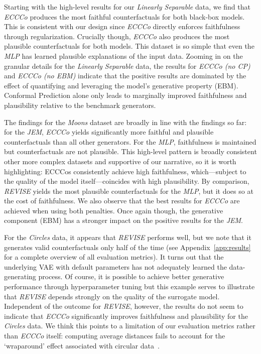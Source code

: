 \documentclass{article}
\begin{document}
Starting with the high-level results for our \textit{Linearly Separable} data, we find that \textit{ECCCo} produces the most faithful counterfactuals for both black-box models. This is consistent with our design since \textit{ECCCo} directly enforces faithfulness through regularization. Crucially though, \textit{ECCCo} also produces the most plausible counterfactuals for both models. This dataset is so simple that even the \textit{MLP} has learned plausible explanations of the input data. Zooming in on the granular details for the \textit{Linearly Separable} data, the results for \textit{ECCCo (no CP)} and \textit{ECCCo (no EBM)} indicate that the positive results are dominated by the effect of quantifying and leveraging the model's generative property (EBM). Conformal Prediction alone only leads to marginally improved faithfulness and plausibility relative to the benchmark generators. 

The findings for the \textit{Moons} dataset are broadly in line with the findings so far: for the \textit{JEM}, \textit{ECCCo} yields significantly more faithful and plausible counterfactuals than all other generators. For the \textit{MLP}, faithfulness is maintained but counterfactuals are not plausible. This high-level pattern is broadly consistent other more complex datasets and supportive of our narrative, so it is worth highlighting: ECCCos consistently achieve high faithfulness, which---subject to the quality of the model itself---coincides with high plausibility. By comparison, \textit{REVISE} yields the most plausible counterfactuals for the \textit{MLP}, but it does so at the cost of faithfulness. We also observe that the best results for \textit{ECCCo} are achieved when using both penalties. Once again though, the generative component (EBM) has a stronger impact on the positive results for the \textit{JEM}.

For the \textit{Circles} data, it appears that \textit{REVISE} performs well, but we note that it generates valid counterfactuals only half of the time (see Appendix~\ref{app:results} for a complete overview of all evaluation metrics). It turns out that the underlying VAE with default parameters has not adequately learned the data-generating process. Of course, it is possible to achieve better generative performance through hyperparameter tuning but this example serves to illustrate that \textit{REVISE} depends strongly on the quality of the surrogate model. Independent of the outcome for \textit{REVISE}, however, the results do not seem to indicate that \textit{ECCCo} significantly improves faithfulness and plausibility for the \textit{Circles} data. We think this points to a limitation of our evaluation metrics rather than \textit{ECCCo} itself: computing average distances fails to account for the `wraparound' effect associated with circular data~\citep{gill2010circular}.
\end{document}
